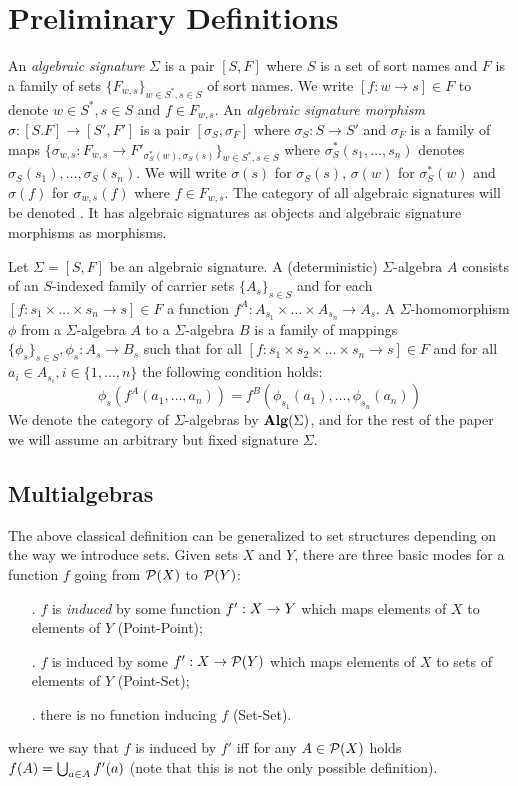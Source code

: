 %
%
\section{Preliminary Definitions}

An {\em algebraic signature} $\Sigma$ is a pair $[S,F]$ where $S$ is a
set of sort names and $F$ is a family of sets $\{F_{w,s}\}_{w \in
S^\ast, s \in S}$ of sort names. We write $[f : w \rightarrow s] \in
F$ to denote $w \in S^\ast, s \in S$ and $f \in F_{w,s}$. An {\em
algebraic signature morphism} $\sigma : [S.F] \rightarrow [S',F']$ is
a pair $[\sigma_S,\sigma_F]$ where $\sigma_S : S \rightarrow S'$ and
$\sigma_F$ is a family of maps $\{\sigma_{w,s} : F_{w,s} \rightarrow
F'_{\sigma^\ast_S(w),\sigma_S(s)}\}_{w \in S^\ast, s \in S}$ where
$\sigma^\ast_S(s_1,\ldots,s_n)$ denotes
$\sigma_S(s_1),\ldots,\sigma_S(s_n)$. We will write $\sigma(s)$ for
$\sigma_S(s)$, $\sigma(w)$ for $\sigma^\ast_S(w)$ and $\sigma(f)$ for
$\sigma_{w,s}(f)$ where $f \in F_{w,s}$.  The category of all
algebraic signatures will be denoted \AlgSig. It has algebraic
signatures as objects and algebraic signature morphisms as morphisms.

Let $\Sigma = [S,F]$ be an algebraic signature. A (deterministic)
$\Sigma$-algebra $A$ consists of an $S$-indexed family of carrier sets
$\{A_s\}_{s \in S}$ and for each $[f : s_1 \times \ldots \times s_n
\rightarrow s] \in F$ a function $f^A : A_{s_1} \times \ldots \times
A_{s_n} \rightarrow A_s$.  A $\Sigma$-homomorphism $\phi$ from a
$\Sigma$-algebra $A$ to a $\Sigma$-algebra $B$ is a family of mappings
$\{\phi_s\}_{s \in S}, \phi_s: A_s \rightarrow B_s$ such that for all
$[f:s_1 \times s_2 \times \ldots \times s_n \rightarrow s] \in F$ and
for all $a_i \in A_{s_i}, i \in \{1,\ldots,n\}$ the following
condition holds:
\[ 
\phi_s(f^A(a_1,\ldots,a_n)) =
f^B(\phi_{s_1}(a_1),\ldots,\phi_{s_n}(a_n))
\]
We denote the category of $\Sigma$-algebras by $\mbox{\rm\bf Alg}(\Sigma)$, and for
the rest of the paper we will assume an arbitrary but fixed signature
$\Sigma$.  

\subsection{Multialgebras}

The above classical definition can be generalized to set structures
depending on the way we introduce sets. Given sets $X$ and $Y$, there
are three basic modes for a function $f$ going from ${\cal P}(X)$ to
${\cal P}(Y)$:
\begin{itemize} 
\item[\PP.] $f$ is {\em induced\/} by some function $f':X \rightarrow Y$
which maps elements of $X$ to elements of $Y$ (Point-Point);
\item[\PS.] $f$ is induced by some $f':X \rightarrow {\cal P}(Y)$ which maps
elements of $X$ to sets of elements of $Y$ (Point-Set);
\item[\SSs.] there is no function inducing $f$ (Set-Set).
\end{itemize}
where we say that $f$ is induced by $f'$ iff for any $A \in {\cal P}(X)$
holds $f(A) = \bigcup_{a \in A} f'(a)$ (note that this is not the only
possible definition). 

